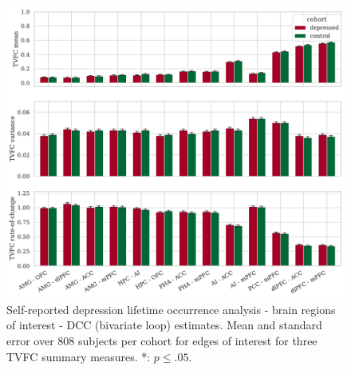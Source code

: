 \begin{figure}[h]
    \centering
    \includegraphics[width=\textwidth]{fig/ukbiobank/TVFC_predictions_summaries/lifetime_occurrence/cohort_comparison/ROI/correlation_all_TVFC_summary_measures_DCC_bivariate_loop_edges_of_interest}
    \caption{
        Self-reported depression lifetime occurrence analysis - brain regions of interest - DCC (bivariate loop) estimates.
        Mean and standard error over 808 subjects per cohort for edges of interest for three TVFC summary measures.
        *: $p \leq .05$.
    }\label{fig:ukb-results-lo-roi-cohort-comparison-edges-of-interest-dcc-bl}
\end{figure}


